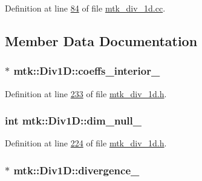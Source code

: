 Definition at line \hyperlink{mtk__div__1d_8cc_source_l00084}{84} of file \hyperlink{mtk__div__1d_8cc_source}{mtk\+\_\+div\+\_\+1d.\+cc}.



\subsection{Member Data Documentation}
\hypertarget{classmtk_1_1Div1D_a7c7688d8ac25120587353ece4e93a13a}{
\subsubsection[{coeffs\+\_\+interior\+\_\+}]{$\ast$ mtk\+::\+Div1\+D\+::coeffs\+\_\+interior\+\_\+\hspace{0.3cm}{\ttfamily [private]}}}\label{classmtk_1_1Div1D_a7c7688d8ac25120587353ece4e93a13a}


Definition at line \hyperlink{mtk__div__1d_8h_source_l00233}{233} of file \hyperlink{mtk__div__1d_8h_source}{mtk\+\_\+div\+\_\+1d.\+h}.

\hypertarget{classmtk_1_1Div1D_a264027144def76d802778391f55381a0}{
\subsubsection[{dim\+\_\+null\+\_\+}]{\setlength{\rightskip}{0pt plus 5cm}int mtk\+::\+Div1\+D\+::dim\+\_\+null\+\_\+\hspace{0.3cm}{\ttfamily [private]}}}\label{classmtk_1_1Div1D_a264027144def76d802778391f55381a0}


Definition at line \hyperlink{mtk__div__1d_8h_source_l00224}{224} of file \hyperlink{mtk__div__1d_8h_source}{mtk\+\_\+div\+\_\+1d.\+h}.

\hypertarget{classmtk_1_1Div1D_a0f96410051ba1fa6d91dfa7b7eacead9}{
\subsubsection[{divergence\+\_\+}]{$\ast$ mtk\+::\+Div1\+D\+::divergence\+\_\+\hspace{0.3cm}{\ttfamily [private]}}}\label{classmtk_1_1Div1D_a0f96410051ba1fa6d91dfa7b7eacead9}


